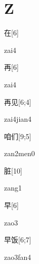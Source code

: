 ﻿%
\section*{Z}

\begin{verbete}[zai4]{在}[6]
\begin{pronuncia}{zai4}
\end{pronuncia}
\end{verbete}

\begin{verbete}[zai4]{再}[6]
\begin{pronuncia}{zai4}
\end{pronuncia}
\end{verbete}

\begin{verbete}{再见}[6;4]
\begin{pronuncia}{zai4jian4}
\end{pronuncia}
\end{verbete}

\begin{verbete}{咱们}[9;5]
\begin{pronuncia}{zan2men0}
\end{pronuncia}
\end{verbete}

\begin{verbete}[zang1]{脏}[10]
\begin{pronuncia}{zang1}
\end{pronuncia}
\end{verbete}

\begin{verbete}[zao3]{早}[6]
\begin{pronuncia}{zao3}
\end{pronuncia}
\end{verbete}

\begin{verbete}{早饭}[6;7]
\begin{pronuncia}{zao3fan4}
\end{pronuncia}
\end{verbete}


